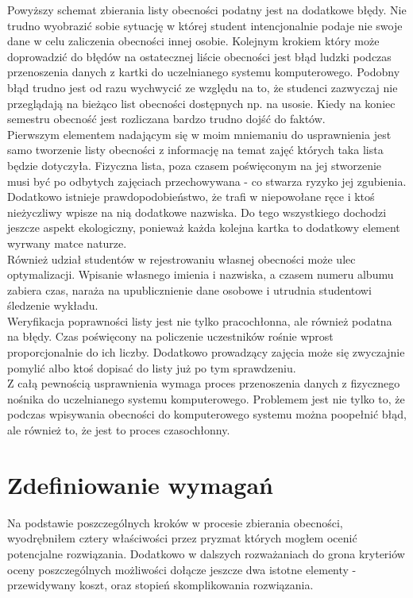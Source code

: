 \documentclass[declaration,shortabstract, mgr]{iithesis}
\begin{document}
\indent Powyższy schemat zbierania listy obecności podatny jest na dodatkowe błędy. Nie trudno wyobrazić sobie sytuację w której student intencjonalnie podaje nie swoje dane w celu zaliczenia obecności innej osobie. Kolejnym krokiem który może doprowadzić do błędów na ostatecznej liście obecności jest błąd ludzki podczas przenoszenia danych z kartki do uczelnianego systemu komputerowego. Podobny błąd trudno jest od razu wychwycić ze względu na to, że studenci zazwyczaj nie przeglądają na bieżąco list obecności dostępnych np. na usosie. Kiedy na koniec semestru obecność jest rozliczana bardzo trudno dojść do faktów.\\
\indent Pierwszym elementem nadającym się w moim mniemaniu do usprawnienia jest samo tworzenie listy obecności z informację na temat zajęć których taka lista będzie dotyczyła. Fizyczna lista, poza czasem poświęconym na jej stworzenie musi być po odbytych zajęciach przechowywana - co stwarza ryzyko jej zgubienia. Dodatkowo istnieje prawdopodobieństwo, że trafi w niepowołane ręce i ktoś nieżyczliwy wpisze na nią dodatkowe nazwiska. Do tego wszystkiego dochodzi jeszcze aspekt ekologiczny, ponieważ każda kolejna kartka to dodatkowy element wyrwany matce naturze. \\
\indent Również udział studentów w rejestrowaniu własnej obecności może ulec optymalizacji. Wpisanie własnego imienia i nazwiska, a czasem numeru albumu zabiera czas, naraża na upublicznienie dane osobowe i utrudnia studentowi śledzenie wykładu.\\
\indent Weryfikacja poprawności listy jest nie tylko pracochłonna, ale również podatna na błędy. Czas poświęcony na policzenie uczestników rośnie wprost proporcjonalnie do ich liczby. Dodatkowo prowadzący zajęcia może się zwyczajnie pomylić albo ktoś dopisać do listy już po tym sprawdzeniu.\\
\indent Z całą pewnością usprawnienia wymaga proces przenoszenia danych z fizycznego nośnika do uczelnianego systemu komputerowego. Problemem jest nie tylko to, że podczas wpisywania obecności do komputerowego systemu można poopełnić błąd, ale również to, że jest to proces czasochłonny.\\

\section{Zdefiniowanie wymagań}

\indent Na podstawie poszczególnych kroków w procesie zbierania obecności, wyodrębniłem cztery właściwości przez pryzmat których mogłem ocenić potencjalne rozwiązania. Dodatkowo w dalszych rozważaniach do grona kryteriów oceny poszczególnych możliwości dołącze jeszcze dwa istotne elementy - przewidywany koszt, oraz stopień skomplikowania rozwiązania.
\end{document}
